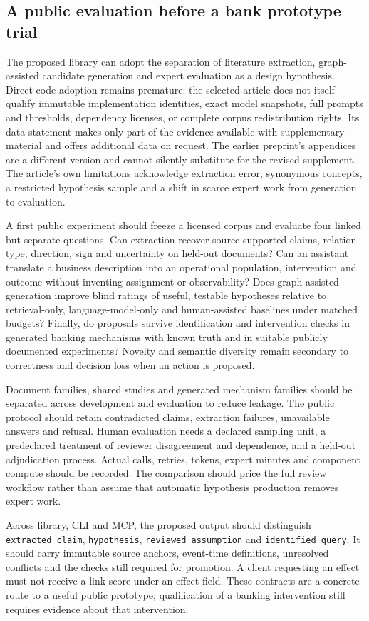 \subsection{A public evaluation before a bank prototype trial}
\label{exec20:hypothesis-prototype}
The proposed library can adopt the separation of literature extraction, graph-assisted candidate generation and expert evaluation as a design hypothesis. Direct code adoption remains premature: the selected article does not itself qualify immutable implementation identities, exact model snapshots, full prompts and thresholds, dependency licenses, or complete corpus redistribution rights. Its data statement makes only part of the evidence available with supplementary material and offers additional data on request. The earlier preprint's appendices are a different version and cannot silently substitute for the revised supplement. The article's own limitations acknowledge extraction error, synonymous concepts, a restricted hypothesis sample and a shift in scarce expert work from generation to evaluation.~\citep{exec20_hypothesis_generation}

A first public experiment should freeze a licensed corpus and evaluate four linked but separate questions. Can extraction recover source-supported claims, relation type, direction, sign and uncertainty on held-out documents? Can an assistant translate a business description into an operational population, intervention and outcome without inventing assignment or observability? Does graph-assisted generation improve blind ratings of useful, testable hypotheses relative to retrieval-only, language-model-only and human-assisted baselines under matched budgets? Finally, do proposals survive identification and intervention checks in generated banking mechanisms with known truth and in suitable publicly documented experiments? Novelty and semantic diversity remain secondary to correctness and decision loss when an action is proposed.

Document families, shared studies and generated mechanism families should be separated across development and evaluation to reduce leakage. The public protocol should retain contradicted claims, extraction failures, unavailable answers and refusal. Human evaluation needs a declared sampling unit, a predeclared treatment of reviewer disagreement and dependence, and a held-out adjudication process. Actual calls, retries, tokens, expert minutes and component compute should be recorded. The comparison should price the full review workflow rather than assume that automatic hypothesis production removes expert work.

Across library, CLI and MCP, the proposed output should distinguish \texttt{extracted\_claim}, \texttt{hypothesis}, \texttt{reviewed\_assumption} and \texttt{identified\_query}. It should carry immutable source anchors, event-time definitions, unresolved conflicts and the checks still required for promotion. A client requesting an effect must not receive a link score under an effect field. These contracts are a concrete route to a useful public prototype; qualification of a banking intervention still requires evidence about that intervention.

